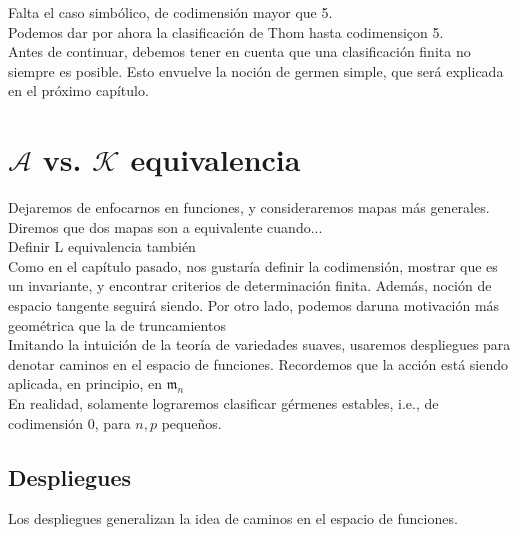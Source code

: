 \documentclass[12pt]{book}
\newcommand{\kg}{\mathcal{K}}
\newcommand{\ag}{\mathcal{A}}
\newcommand{\mm}{\mathfrak{m}_n}
\begin{document}
Falta el caso simbólico, de codimensión mayor que 5.\\
Podemos dar por ahora la clasificación de Thom hasta codimensiçon 5.\\

Antes de continuar, debemos tener en cuenta que una clasificación finita no siempre es posible. Esto envuelve la noción de germen simple, que será explicada en el próximo capítulo.\\












\chapter{$\ag$ vs. $\kg$ equivalencia}
Dejaremos de enfocarnos en funciones, y consideraremos mapas más generales.\\

Diremos que dos mapas son a equivalente cuando...\\
Definir L equivalencia también\\

Como en el capítulo pasado, nos gustaría definir la codimensión, mostrar que es un invariante, y encontrar criterios de determinación finita. Además, noción de espacio tangente seguirá siendo. Por otro lado, podemos daruna motivación más geométrica que la de truncamientos \\

Imitando la intuición de la teoría de variedades suaves, usaremos despliegues para denotar caminos en el espacio de funciones. Recordemos que la acción está siendo aplicada, en principio, en $\mm$\\
En realidad, solamente lograremos clasificar gérmenes estables, i.e., de codimensión $0$, para $n,p$ pequeños.\\



\section{Despliegues}

Los despliegues generalizan la idea de caminos en el espacio de funciones.\\
\end{document}
